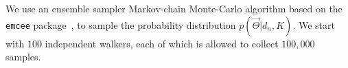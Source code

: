 \documentclass[aps,prd,amsmath,floats,floatfix, twocolumn,
superscriptaddress,nofootinbib,showpacs]{revtex4-1}
\newcommand{\lambdans}{\Lambda_\mathrm{NS}}
\newcommand{\chibh}{\chi_\mathrm{BH}}
\newcommand{\LL}{\mathcal{L}}
\begin{document}
We use an ensemble sampler Markov-chain Monte-Carlo algorithm based on the
{\tt emcee} package~\cite{emcee}, to sample the probability distribution 
$p(\vec{\Theta} | d_n, K)$. We start with $100$ independent walkers, each
of which is allowed to collect $100,000$ samples.
% 
% 
\end{document}
